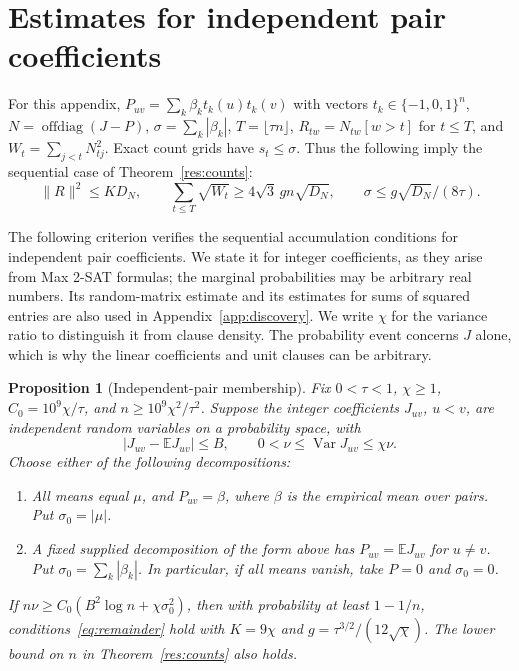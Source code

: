\documentclass[11pt,a4paper]{article}
\newtheorem{proposition}[theorem]{Proposition}
\theoremstyle{definition}
\theoremstyle{remark}
\newcommand{\E}{\mathbb E}
\begin{document}
\section{Estimates for independent pair coefficients}\label{app:membership}

For this appendix, $P_{uv}=\sum_k\beta_kt_k(u)t_k(v)$ with vectors
$t_k\in\{-1,0,1\}^n$, $N=\operatorname{offdiag}(J-P)$,
$\sigma=\sum_k|\beta_k|$,
$T=\lfloor\tau n\rfloor$, $R_{tw}=N_{tw}[w>t]$ for $t\le T$, and
$W_t=\sum_{j<t}N_{tj}^2$. Exact count grids have $s_t\le\sigma$.
Thus the following imply the sequential case of Theorem~\ref{res:counts}:
\begin{equation}
 \|R\|^2\le KD_N,\qquad
 \sum_{t\le T}\sqrt{W_t}\ge4\sqrt3\,gn\sqrt{D_N},\qquad
 \sigma\le g\sqrt{D_N}/(8\tau).\label{eq:remainder}
\end{equation}

The following criterion verifies the sequential accumulation conditions
for independent pair coefficients. We state it for integer coefficients,
as they arise from Max 2-SAT formulas; the marginal
probabilities may be arbitrary real numbers. Its random-matrix estimate and
its estimates for sums of squared entries are also used in
Appendix~\ref{app:discovery}. We write $\chi$
for the variance ratio to distinguish it from clause density. The probability event concerns $J$ alone, which is
why the linear coefficients and unit clauses can be arbitrary.

\begin{proposition}[Independent-pair membership]\label{prop:pairmembership}
Fix $0<\tau<1$, $\chi\ge1$, $C_0=10^9\chi/\tau$, and
$n\ge10^9\chi^2/\tau^2$. Suppose the integer coefficients $J_{uv}$,
$u<v$, are independent random variables on a probability space, with
\[
 |J_{uv}-\E J_{uv}|\le B,\qquad
 0<\nu\le\operatorname{Var}J_{uv}\le\chi\nu.
\]
Choose either of the following decompositions:
\begin{enumerate}
\item All means equal $\mu$, and $P_{uv}=\beta$, where $\beta$ is the
empirical mean over pairs. Put $\sigma_0=|\mu|$.
\item A fixed supplied decomposition of the form above has
$P_{uv}=\E J_{uv}$ for $u\ne v$.
Put $\sigma_0=\sum_k|\beta_k|$. In particular, if all means vanish,
take $P=0$ and $\sigma_0=0$.
\end{enumerate}
If $n\nu\ge C_0(B^2\log n+\chi\sigma_0^2)$, then with probability at least
$1-1/n$, conditions~\eqref{eq:remainder} hold with
$K=9\chi$ and $g=\tau^{3/2}/(12\sqrt\chi)$.
The lower bound on $n$ in Theorem~\ref{res:counts} also holds.
\end{proposition}
\end{document}

